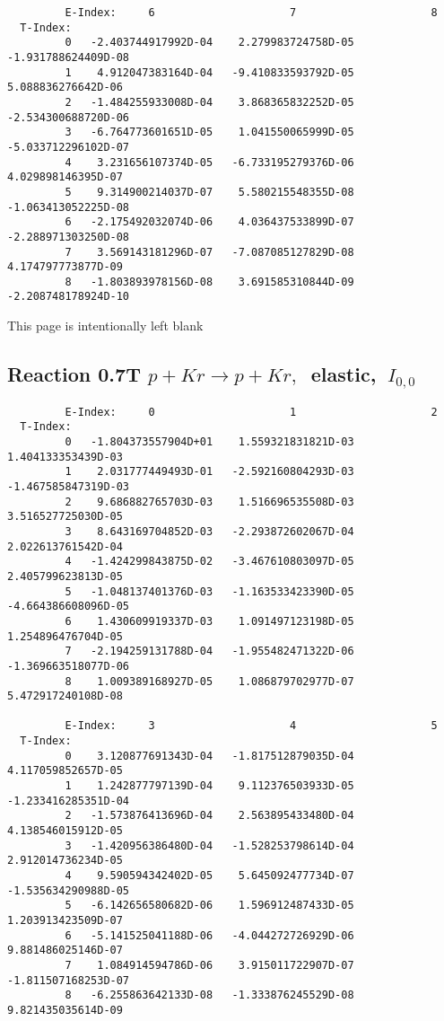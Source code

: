 \documentclass[12pt,dvipdfmx]{article}
\begin{document}
{\begin{small}
\begin{verbatim}
         E-Index:     6                     7                     8
  T-Index:
         0   -2.403744917992D-04    2.279983724758D-05   -1.931788624409D-08
         1    4.912047383164D-04   -9.410833593792D-05    5.088836276642D-06
         2   -1.484255933008D-04    3.868365832252D-05   -2.534300688720D-06
         3   -6.764773601651D-05    1.041550065999D-05   -5.033712296102D-07
         4    3.231656107374D-05   -6.733195279376D-06    4.029898146395D-07
         5    9.314900214037D-07    5.580215548355D-08   -1.063413052225D-08
         6   -2.175492032074D-06    4.036437533899D-07   -2.288971303250D-08
         7    3.569143181296D-07   -7.087085127829D-08    4.174797773877D-09
         8   -1.803893978156D-08    3.691585310844D-09   -2.208748178924D-10

\end{verbatim}\end{small}
\newpage
This page is intentionally left blank
\newpage


\subsection{
Reaction 0.7T  $p + Kr \rightarrow p + Kr ,\ $
 elastic, $\  I_{0,0}$
}

\begin{small}\begin{verbatim}
         E-Index:     0                     1                     2
  T-Index:
         0   -1.804373557904D+01    1.559321831821D-03    1.404133353439D-03
         1    2.031777449493D-01   -2.592160804293D-03   -1.467585847319D-03
         2    9.686882765703D-03    1.516696535508D-03    3.516527725030D-05
         3    8.643169704852D-03   -2.293872602067D-04    2.022613761542D-04
         4   -1.424299843875D-02   -3.467610803097D-05    2.405799623813D-05
         5   -1.048137401376D-03   -1.163533423390D-05   -4.664386608096D-05
         6    1.430609919337D-03    1.091497123198D-05    1.254896476704D-05
         7   -2.194259131788D-04   -1.955482471322D-06   -1.369663518077D-06
         8    1.009389168927D-05    1.086879702977D-07    5.472917240108D-08

         E-Index:     3                     4                     5
  T-Index:
         0    3.120877691343D-04   -1.817512879035D-04    4.117059852657D-05
         1    1.242877797139D-04    9.112376503933D-05   -1.233416285351D-04
         2   -1.573876413696D-04    2.563895433480D-04    4.138546015912D-05
         3   -1.420956386480D-04   -1.528253798614D-04    2.912014736234D-05
         4    9.590594342402D-05    5.645092477734D-07   -1.535634290988D-05
         5   -6.142656580682D-06    1.596912487433D-05    1.203913423509D-07
         6   -5.141525041188D-06   -4.044272726929D-06    9.881486025146D-07
         7    1.084914594786D-06    3.915011722907D-07   -1.811507168253D-07
         8   -6.255863642133D-08   -1.333876245529D-08    9.821435035614D-09


\end{verbatim}
\end{small}}
\end{document}
